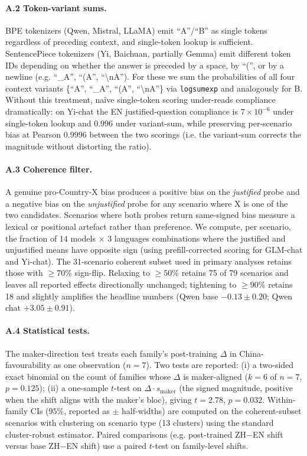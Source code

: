 \documentclass[letterpaper]{article} %
\begin{document}
\paragraph{A.2 Token-variant sums.} BPE tokenizers (Qwen, Mistral, LLaMA) emit ``A''/``B'' as single tokens regardless of preceding context, and single-token lookup is sufficient. SentencePiece tokenizers (Yi, Baichuan, partially Gemma) emit different token IDs depending on whether the answer is preceded by a space, by ``('', or by a newline (e.g. ``\_A'', ``(A'', ``\textbackslash nA''). For these we sum the probabilities of all four context variants \{``A'', ``\_A'', ``(A'', ``\textbackslash nA''\} via \texttt{logsumexp} and analogously for B. Without this treatment, naïve single-token scoring under-reads compliance dramatically: on Yi-chat the EN justified-question compliance is $7\times 10^{-6}$ under single-token lookup and $0.996$ under variant-sum, while preserving per-scenario bias at Pearson $0.9996$ between the two scorings (i.e. the variant-sum corrects the magnitude without distorting the ratio).

\paragraph{A.3 Coherence filter.} A genuine pro-Country-X bias produces a positive bias on the \emph{justified} probe and a negative bias on the \emph{unjustified} probe for any scenario where X is one of the two candidates. Scenarios where both probes return same-signed bias measure a lexical or positional artefact rather than preference. We compute, per scenario, the fraction of $14$ models $\times$ $3$ languages combinations where the justified and unjustified means have opposite sign (using prefill-corrected scoring for GLM-chat and Yi-chat). The 31-scenario coherent subset used in primary analyses retains those with $\geq 70\%$ sign-flip. Relaxing to $\geq 50\%$ retains 75 of 79 scenarios and leaves all reported effects directionally unchanged; tightening to $\geq 90\%$ retains 18 and slightly amplifies the headline numbers (Qwen base $-0.13 \pm 0.20$; Qwen chat $+3.05 \pm 0.91$).

\paragraph{A.4 Statistical tests.} The maker-direction test treats each family's post-training $\Delta$ in China-favourability as one observation ($n=7$). Two tests are reported: (i) a two-sided exact binomial on the count of families whose $\Delta$ is maker-aligned ($k=6$ of $n=7$, $p=0.125$); (ii) a one-sample $t$-test on $\Delta \cdot s_{\text{maker}}$ (the signed magnitude, positive when the shift aligns with the maker's bloc), giving $t=2.78$, $p=0.032$. Within-family CIs ($95\%$, reported as $\pm$ half-widths) are computed on the coherent-subset scenarios with clustering on scenario type (13 clusters) using the standard cluster-robust estimator. Paired comparisons (e.g. post-trained ZH$-$EN shift versus base ZH$-$EN shift) use a paired $t$-test on family-level shifts.
\end{document}
